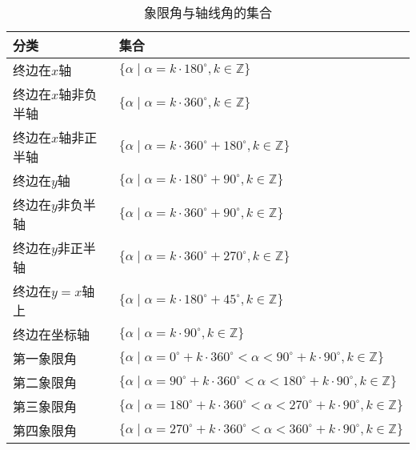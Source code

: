 \begin{note}
\begin{table}[htbp]
  \caption{象限角与轴线角的集合\label{tab:color thm}}
  \centering
  \begin{tabular}{ll}
  \toprule
              分类
              & 集合\\
  \midrule
              终边在$x$轴
              & $\{\alpha \mid \alpha = k \cdot 180^{\circ}, k \in \mathbb{Z}\}$\\
              终边在$x$轴非负半轴
              & $\{\alpha \mid \alpha = k \cdot 360^{\circ}, k \in \mathbb{Z}\}$\\
              终边在$x$轴非正半轴
              & $\{\alpha \mid \alpha = k \cdot 360^{\circ} + 180^{\circ}, k \in \mathbb{Z}\}$ \\
              终边在$y$轴
              & $\{\alpha \mid \alpha = k \cdot 180^{\circ} + 90^{\circ}, k \in \mathbb{Z}\}$\\
              终边在$y$非负半轴
              & $\{\alpha \mid \alpha = k \cdot 360^{\circ} + 90^{\circ}, k \in \mathbb{Z}\}$\\
              终边在$y$非正半轴
              & $\{\alpha \mid \alpha = k \cdot 360^{\circ} + 270^{\circ}, k \in \mathbb{Z}\}$\\
			  终边在$y=x$轴上              
              & $\{\alpha \mid \alpha = k \cdot 180^{\circ} + 45^{\circ}, k \in \mathbb{Z}\}$\\
              终边在坐标轴
              & $\{\alpha \mid \alpha = k \cdot 90^{\circ}, k \in \mathbb{Z}\}$\\
              第一象限角
              & $\{\alpha \mid \alpha = 0^{\circ} + k \cdot 360^{\circ} < \alpha < 90^{\circ} + k \cdot 90^{\circ}, k \in \mathbb{Z}\}$\\
              第二象限角
              & $\{\alpha \mid \alpha = 90^{\circ} + k \cdot 360^{\circ} < \alpha < 180^{\circ} + k \cdot 90^{\circ}, k \in \mathbb{Z}\}$\\
              第三象限角
              & $\{\alpha \mid \alpha = 180^{\circ} + k \cdot 360^{\circ} < \alpha < 270^{\circ} + k \cdot 90^{\circ}, k \in \mathbb{Z}\}$\\
              第四象限角
              & $\{\alpha \mid \alpha = 270^{\circ} + k \cdot 360^{\circ} < \alpha < 360^{\circ} + k \cdot 90^{\circ}, k \in \mathbb{Z}\}$\\
  \bottomrule
  \end{tabular}
\end{table}
\end{note}

